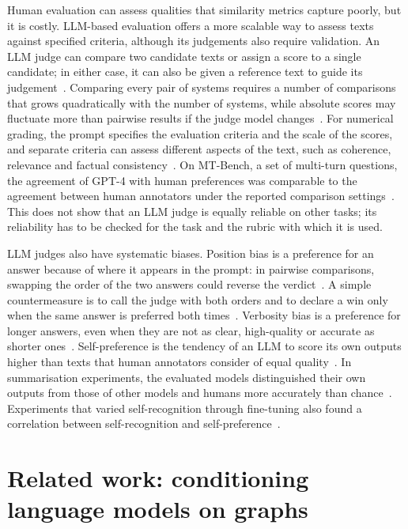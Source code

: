 Human evaluation can assess qualities that similarity metrics capture poorly, but it is costly. LLM-based evaluation offers a more scalable way to assess texts against specified criteria, although its judgements also require validation. An LLM judge can compare two candidate texts or assign a score to a single candidate; in either case, it can also be given a reference text to guide its judgement~\cite{zheng2023judging}. Comparing every pair of systems requires a number of comparisons that grows quadratically with the number of systems, while absolute scores may fluctuate more than pairwise results if the judge model changes~\cite{zheng2023judging}. For numerical grading, the prompt specifies the evaluation criteria and the scale of the scores, and separate criteria can assess different aspects of the text, such as coherence, relevance and factual consistency~\cite{liu2023geval}. On MT-Bench, a set of multi-turn questions, the agreement of GPT-4 with human preferences was comparable to the agreement between human annotators under the reported comparison settings~\cite{zheng2023judging}. This does not show that an LLM judge is equally reliable on other tasks; its reliability has to be checked for the task and the rubric with which it is used.

LLM judges also have systematic biases. Position bias is a preference for an answer because of where it appears in the prompt: in pairwise comparisons, swapping the order of the two answers could reverse the verdict~\cite{wang2024large, zheng2023judging}. A simple countermeasure is to call the judge with both orders and to declare a win only when the same answer is preferred both times~\cite{zheng2023judging}. Verbosity bias is a preference for longer answers, even when they are not as clear, high-quality or accurate as shorter ones~\cite{zheng2023judging}. Self-preference is the tendency of an LLM to score its own outputs higher than texts that human annotators consider of equal quality~\cite{panickssery2024llm}. In summarisation experiments, the evaluated models distinguished their own outputs from those of other models and humans more accurately than chance~\cite{panickssery2024llm}. Experiments that varied self-recognition through fine-tuning also found a correlation between self-recognition and self-preference~\cite{panickssery2024llm}.

\section{Related work: conditioning language models on graphs}
\label{sec:related-work}


